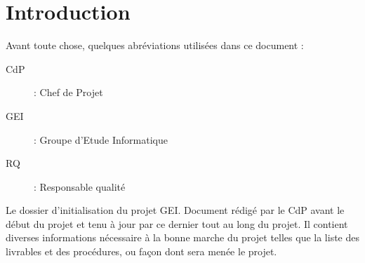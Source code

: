 \section{Introduction}

Avant toute chose, quelques abréviations utilisées dans ce document :

\begin{description}
\item[CdP] : Chef de Projet
\item[GEI] : Groupe d'Etude Informatique
\item[RQ] : Responsable qualité
\end{description}

Le dossier d'initialisation du projet GEI. Document rédigé par le CdP avant le 
début du projet et tenu à jour par ce dernier tout au long du projet. Il
contient diverses informations nécessaire à la bonne marche du projet telles que
la liste des livrables et des procédures, ou façon dont sera menée le projet.